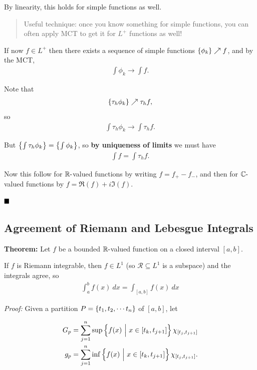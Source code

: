 By linearity, this holds for simple functions as well.

\begin{quote}
Useful technique: once you know something for simple functions, you can
often apply MCT to get it for \(L^+\) functions as well!
\end{quote}

If now \(f\in L^+\) then there exists a sequence of simple functions
\(\left\{{\phi_k}\right\} \nearrow f\), and by the MCT,
\begin{align*}
\int \phi_k \to \int f
.\end{align*}

Note that
\begin{align*}
\left\{{\tau_h \phi_k}\right\} \nearrow \tau_h f
,\end{align*} so
\begin{align*}
\int \tau_h \phi_k \to \int \tau_h f
.\end{align*}

But \(\left\{{\int\tau_h \phi_k}\right\} = \left\{{\int\phi_k}\right\}\), so \textbf{by
uniqueness of limits} we must have
\begin{align*}
\int f = \int \tau_h f
.\end{align*}

Now this follow for \({\mathbb{R}}{\hbox{-}}\)valued functions by writing
\(f = f_+ - f_-\), and then for \({\mathbb{C}}{\hbox{-}}\)valued functions by
\(f = \Re(f) + i \Im(f)\).

\(\qed\)

\hypertarget{agreement-of-riemann-and-lebesgue-integrals}{%
\subsection{Agreement of Riemann and Lebesgue
Integrals}\label{agreement-of-riemann-and-lebesgue-integrals}}

\textbf{Theorem:} Let \(f\) be a bounded \({\mathbb{R}}{\hbox{-}}\)valued function on
a closed interval \([a,b]\).

If \(f\) is Riemann integrable, then \(f \in L^1\) (so
\(\mathcal{R} \subseteq L^1\) is a subspace) and the integrals agree, so
\begin{align*}
\int_a^b f(x)~dx = \int_{[a,b]} f(x)~dx
\end{align*}

\emph{Proof:} Given a partition \(P = \left\{{t_1, t_2, \cdots t_n}\right\}\) of
\([a,b]\), let

\begin{align*}
G_p &= \sum_{j=1}^n \sup \left\{{f(x) {~\mathrel{\Big|}~} x \in [t_k, t_{j+1}]}\right\} \chi_{[t_j, t_{j+1}]} \\
g_p &= \sum_{j=1}^n \inf \left\{{f(x) {~\mathrel{\Big|}~} x \in [t_k, t_{j+1}]}\right\} \chi_{[t_j, t_{j+1}]}
.\end{align*}


